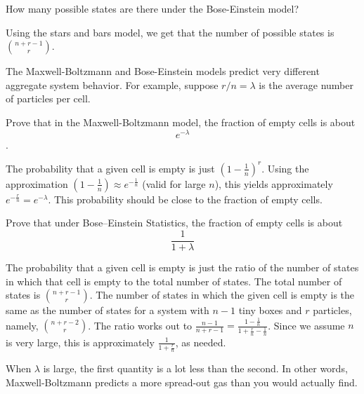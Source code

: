 \begin{problem}
\begin{problemparts}
\problempart How many possible states are there under the Bose-Einstein model?

\begin{solution}
Using the stars and bars model, we get that the number of possible
states is ${n+r-1 \choose r}$.
\end{solution}

The Maxwell-Boltzmann and Bose-Einstein models predict very different
aggregate system behavior.  For example, suppose $r/n = \lambda$ is
the average number of particles per cell.

\problempart Prove that in the Maxwell-Boltzmann model, the fraction of empty
cells is about
\[
e^{-\lambda}
\].

\begin{solution}
The probability that a given cell is empty is just $(1 -
\frac{1}{n})^r$.
Using the approximation $(1 - \frac{1}{n}) \approx e^{-\frac{1}{n}}$
(valid for large $n$), 
this yields approximately $e^{-\frac{r}{n}} = e^{-\lambda}$.
This probability should be close to the fraction of empty cells.
\end{solution}

\problempart Prove that under Bose--Einstein Statistics, the fraction of empty
cells is about
\[
\frac{1}{1+\lambda}
\]

\begin{solution}
The probability that a given cell is empty is just the ratio of the
number of states in which that cell is empty to the total number of
states.  The total number of states is ${n+r-1 \choose r}$.  The
number of states in which the given cell is empty is the same as the
number of states for a system with $n-1$ tiny boxes and $r$ particles,
namely, ${n+r-2 \choose r}$.  The ratio works out to
$\frac{n-1}{n+r-1} = \frac{1 - \frac{1}{n}}{1 +
\frac{r}{n} - \frac{1}{n}}$.
Since we assume $n$ is very large, this is approximately $\frac{1}{1
+ \frac{r}{n}}$, as needed.

When $\lambda$ is large, the first quantity is a lot less than the
second.  In other words, Maxwell-Boltzmann predicts a more spread-out
gas than you would actually find.
\end{solution}

\end{problemparts}
\end{problem}
                                 
\endinput
